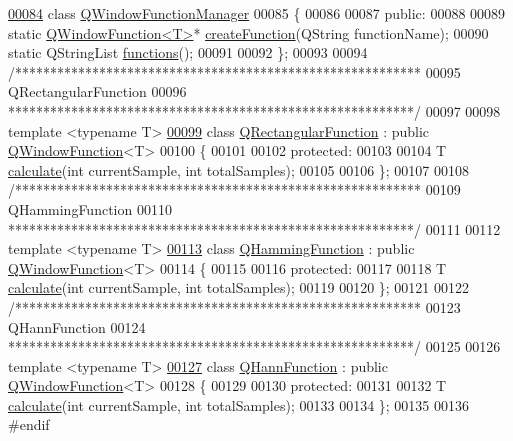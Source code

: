 \begin{DoxyCode}
\hypertarget{a00128_source_l00084}{}\hyperlink{a00072}{00084} \textcolor{keyword}{class }\hyperlink{a00072}{QWindowFunctionManager}
00085 \{
00086 
00087     \textcolor{keyword}{public}:
00088 
00089         \textcolor{keyword}{static} \hyperlink{a00071}{QWindowFunction<T>}* \hyperlink{a00072_a3c72b178730b8731087337bcbfcbd4b7}{createFunction}(QString functionName);
00090         \textcolor{keyword}{static} QStringList \hyperlink{a00072_ae0508780c15f6c28fb566dfe76c9a082}{functions}();
00091 
00092 \};
00093 
00094 \textcolor{comment}{/**********************************************************}
00095 \textcolor{comment}{QRectangularFunction}
00096 \textcolor{comment}{**********************************************************/}
00097 
00098 \textcolor{keyword}{template} <\textcolor{keyword}{typename} T>
\hypertarget{a00128_source_l00099}{}\hyperlink{a00062}{00099} \textcolor{keyword}{class }\hyperlink{a00062}{QRectangularFunction} : \textcolor{keyword}{public} \hyperlink{a00071}{QWindowFunction}<T>
00100 \{
00101 
00102     \textcolor{keyword}{protected}:
00103 
00104         T \hyperlink{a00062_add2d1c665e03d573a4349324acfdd0e6}{calculate}(\textcolor{keywordtype}{int} currentSample, \textcolor{keywordtype}{int} totalSamples);
00105 
00106 \};
00107 
00108 \textcolor{comment}{/**********************************************************}
00109 \textcolor{comment}{QHammingFunction}
00110 \textcolor{comment}{**********************************************************/}
00111 
00112 \textcolor{keyword}{template} <\textcolor{keyword}{typename} T>
\hypertarget{a00128_source_l00113}{}\hyperlink{a00056}{00113} \textcolor{keyword}{class }\hyperlink{a00056}{QHammingFunction} : \textcolor{keyword}{public} \hyperlink{a00071}{QWindowFunction}<T>
00114 \{
00115 
00116     \textcolor{keyword}{protected}:
00117 
00118         T \hyperlink{a00056_a211906f8eb2b7b00b2edda7a9d0926a6}{calculate}(\textcolor{keywordtype}{int} currentSample, \textcolor{keywordtype}{int} totalSamples);
00119 
00120 \};
00121 
00122 \textcolor{comment}{/**********************************************************}
00123 \textcolor{comment}{QHannFunction}
00124 \textcolor{comment}{**********************************************************/}
00125 
00126 \textcolor{keyword}{template} <\textcolor{keyword}{typename} T>
\hypertarget{a00128_source_l00127}{}\hyperlink{a00057}{00127} \textcolor{keyword}{class }\hyperlink{a00057}{QHannFunction} : \textcolor{keyword}{public} \hyperlink{a00071}{QWindowFunction}<T>
00128 \{
00129 
00130     \textcolor{keyword}{protected}:
00131 
00132         T \hyperlink{a00057_a4c93ae740237871fc75e3bea81521f35}{calculate}(\textcolor{keywordtype}{int} currentSample, \textcolor{keywordtype}{int} totalSamples);
00133 
00134 \};
00135 
00136 \textcolor{preprocessor}{#endif}
\end{DoxyCode}
